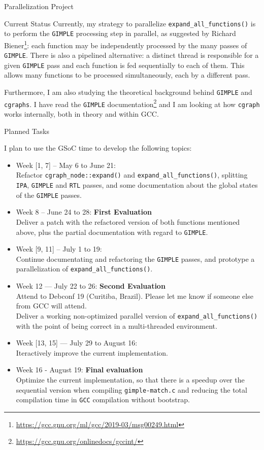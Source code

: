 \begin{section}{Parallelization Project}
\begin{subsection}{Current Status}
Currently, my strategy to parallelize \texttt{expand\_all\_functions()} is to
perform the \texttt{GIMPLE} processing step in parallel, as suggested
by Richard Biener\footnote{\url{https://gcc.gnu.org/ml/gcc/2019-03/msg00249.html}}: each
function may be independently processed by the many passes of
\texttt{GIMPLE}.  There is also a pipelined alternative: a distinct
thread is responsible for a given \texttt{GIMPLE} pass and each
function is fed sequentially to each of them. This allows many
functions to be processed simultaneously, each by a different pass.

Furthermore, I am also studying the theoretical background behind \texttt{GIMPLE}
and \texttt{cgraphs}. I have read the \texttt{GIMPLE}
documentation\footnote{\url{https://gcc.gnu.org/onlinedocs/gccint/}} and
I am looking at how \texttt{cgraph} works internally, both in theory and within
GCC.

\end{subsection}

\begin{subsection}{Planned Tasks}

I plan to use the GSoC time to develop the following topics:

\begin{itemize}
 \item{Week [1, 7] -- May 6 to June 21:} \\
Refactor \texttt{cgraph\_node::expand()} and
\texttt{expand\_all\_functions()}, splitting \texttt{IPA},
\texttt{GIMPLE} and \texttt{RTL} passes, and some documentation about
the global states of the \texttt{GIMPLE} passes.
 \item{Week 8 -- June 24 to 28:} \textbf{First Evaluation} \\
Deliver a patch with the refactored version of both functions mentioned above,
plus the partial documentation with regard to \texttt{GIMPLE}.
 \item{Week [9, 11] -- July 1 to 19:} \\
Continue documentating and refactoring the \texttt{GIMPLE} passes, and
prototype a parallelization of \texttt{expand\_all\_functions()}.
 \item{Week 12 --- July 22 to 26:} \textbf{Second Evaluation} \\
Attend to Debconf 19 (Curitiba, Brazil). Please let me know
if someone else from GCC will attend. \\
Deliver a
working non-optimized parallel version of \texttt{expand\_all\_functions()}
with the point of being correct in a multi-threaded environment.
\item{Week [13, 15] --- July 29 to August 16:} \\
Iteractively improve the current implementation.
\item{Week 16 - August 19:} \textbf{Final evaluation}\\
Optimize the current implementation, so that there is a speedup over
the sequential version when compiling \texttt{gimple-match.c} and reducing the
total compilation time in \texttt{GCC} compilation without bootstrap.
\end{itemize}


\end{subsection}
\end{section}

